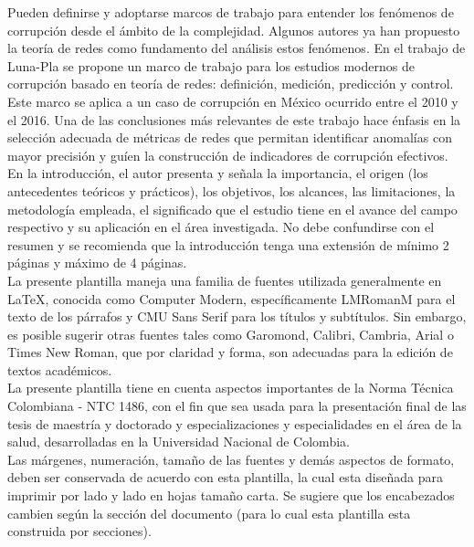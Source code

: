 Pueden definirse y adoptarse marcos de trabajo para entender los fenómenos de corrupción desde el ámbito de la complejidad. Algunos autores ya han propuesto la teoría de redes como fundamento del análisis estos fenómenos. En el trabajo de Luna-Pla \cite{luna2020corruption} se propone un marco de trabajo para los estudios modernos de corrupción basado en teoría de redes: definición, medición, predicción y control. Este marco se aplica a un caso de corrupción en México ocurrido entre el 2010 y el 2016. Una de las conclusiones más relevantes de este trabajo hace énfasis en la selección adecuada de métricas de redes que permitan identificar anomalías con mayor precisión y guíen la construcción de indicadores de corrupción efectivos.\\






\iffalse
En la introducción, el autor presenta y se\~{n}ala la importancia, el origen (los antecedentes teóricos y prácticos), los objetivos, los alcances, las limitaciones, la metodología empleada, el significado que el estudio tiene en el avance del campo respectivo y su aplicación en el área investigada. No debe confundirse con el resumen y se recomienda que la introducción tenga una extensión de mínimo 2 páginas y máximo de 4 páginas.\\

La presente plantilla maneja una familia de fuentes utilizada generalmente en LaTeX, conocida como Computer Modern, específicamente LMRomanM para el texto de los párrafos y CMU Sans Serif para los títulos y subtítulos. Sin embargo, es posible sugerir otras fuentes tales como Garomond, Calibri, Cambria, Arial o Times New Roman, que por claridad y forma, son adecuadas para la edición de textos académicos.\\

La presente plantilla tiene en cuenta aspectos importantes de la Norma Técnica Colombiana - NTC 1486, con el fin que sea usada para la presentación final de las tesis de maestría y doctorado y especializaciones y especialidades en el área de la salud, desarrolladas en la Universidad Nacional de Colombia.\\

Las márgenes, numeración, tama\~{n}o de las fuentes y demás aspectos de formato, deben ser conservada de acuerdo con esta plantilla, la cual esta dise\~{n}ada para imprimir por lado y lado en hojas tama\~{n}o carta. Se sugiere que los encabezados cambien según la sección del documento (para lo cual esta plantilla esta construida por secciones).\\

